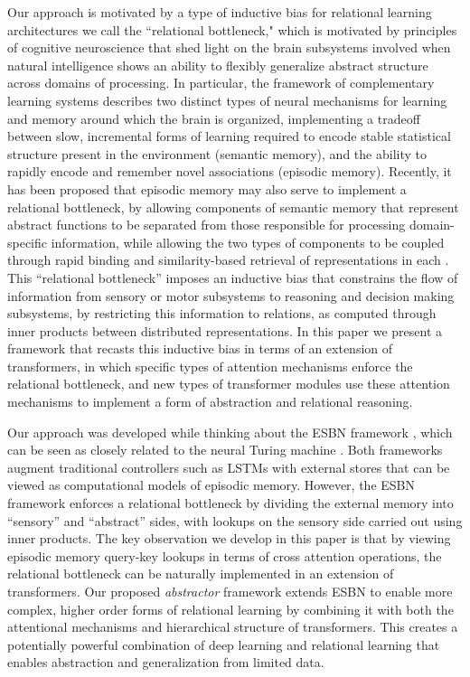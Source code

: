 Our approach is motivated by a type of inductive bias for relational learning architectures we call the
``relational bottleneck," which is motivated by principles of cognitive neuroscience that shed light on the brain
subsystems involved when natural intelligence shows an ability to flexibly generalize abstract structure across
domains of processing. In particular, the framework of complementary learning systems \citep{McClelland:1995,
    Kumaran:2016} describes two distinct types of neural mechanisms for learning and memory around which the brain
is organized, implementing a tradeoff between slow, incremental forms of learning required to encode stable statistical
structure present in the environment (semantic memory), and the ability to rapidly encode and remember novel
associations
(episodic memory).
Recently, it has been proposed that episodic memory may also serve to implement a relational bottleneck,
by allowing components of semantic memory that represent abstract functions to be separated from those
responsible for processing domain-specific information, while allowing the two types of components to be coupled
through rapid binding and similarity-based retrieval of representations in each \cite{esbn}.
This
``relational bottleneck'' imposes an inductive bias that constrains the flow of information from sensory or motor subsystems to reasoning and
decision making subsystems, by restricting this information to relations, as computed through inner products
between distributed representations. In this paper we present a framework that
recasts
this inductive bias in terms of an extension of transformers, in which specific types of attention mechanisms enforce
the relational bottleneck, and new types of transformer modules use these attention mechanisms to implement a form of
abstraction and relational reasoning.

Our approach was developed while thinking about the ESBN framework \citep{esbn}, which can be seen as 
closely related to the neural Turing machine \citep{NTM}. Both frameworks augment traditional controllers such as 
LSTMs with external stores that can be viewed as computational models of episodic memory. However, the ESBN
framework enforces a relational bottleneck by dividing the external memory into ``sensory'' and ``abstract'' sides,
with lookups on the sensory side carried out using inner products. The key observation we develop in this paper is
that by viewing episodic memory query-key lookups in terms of cross attention operations, the relational bottleneck can be
naturally implemented in an extension of transformers. Our proposed \textit{abstractor} framework extends ESBN to
enable more complex, higher order forms of relational learning by combining it with both the attentional mechanisms
and hierarchical structure of transformers. This creates a potentially powerful combination of deep learning and
relational learning that enables abstraction and generalization from limited data.
